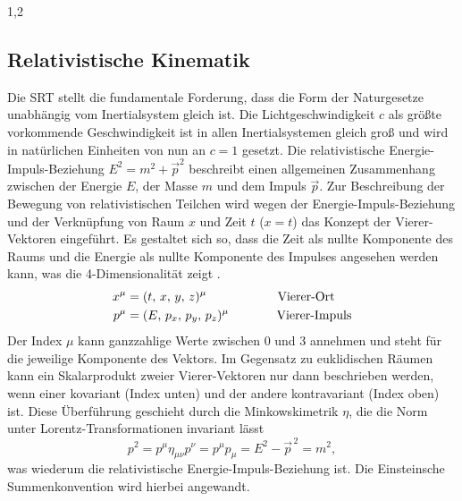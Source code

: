 \documentclass[11pt,a4paper,twoside]{report}
\begin{document}
\begin{spacing}{1,2}
\subsection{Relativistische Kinematik}
Die SRT stellt die fundamentale Forderung, dass die Form der Naturgesetze unabhängig vom Inertialsystem gleich ist. Die Lichtgeschwindigkeit $c$ als
größte vorkommende Geschwindigkeit ist in allen Inertialsystemen gleich groß und wird in natürlichen Einheiten von nun an $c=1$ gesetzt. Die relativistische 
Energie-Impuls-Beziehung $E^2 = m^2 + \vec p^2$ beschreibt einen allgemeinen Zusammenhang zwischen der Energie $E$, der Masse $m$ 
und dem Impuls $\vec p$.
% 
\noindent
Zur Beschreibung der Bewegung von relativistischen Teilchen wird wegen der Energie-Impuls-Beziehung und der Verknüpfung von Raum $x$ und Zeit $t$ ($x = t$) das Konzept
der Vierer-Vektoren eingeführt. Es gestaltet sich so, dass die Zeit als nullte Komponente des Raums und die Energie als nullte Komponente des Impulses angesehen werden
kann, was die 4-Dimensionalität zeigt \cite{RelKin}.
\begin{align}
 x^\mu &= (t,\,x,\,y,\,z)^\mu \hspace{2cm} \text{Vierer-Ort}\\
 p^\mu &= (E,\,p_x,\,p_y,\,p_z)^\mu \hspace{1.35cm} \text{Vierer-Impuls}
\end{align}
Der Index $\mu$ kann ganzzahlige Werte zwischen 0 und 3 annehmen und steht für die jeweilige Komponente des Vektors. Im Gegensatz zu euklidischen Räumen 
kann ein Skalarprodukt zweier Vierer-Vektoren nur dann beschrieben werden, wenn einer kovariant (Index unten) und der andere kontravariant (Index oben) ist.
Diese Überführung geschieht durch die Minkowskimetrik $\eta$, die die Norm unter Lorentz-Transformationen invariant lässt
\begin{equation}
  p^2 = p^\mu \eta_{\mu \nu} p^\nu = p^\mu p_\mu = E^2 - \vec{p}^{\,2} = m^2,
\end{equation}
was wiederum die relativistische Energie-Impuls-Beziehung ist. Die Einsteinsche Summenkonvention wird hierbei angewandt.

\end{spacing}
\end{document}
